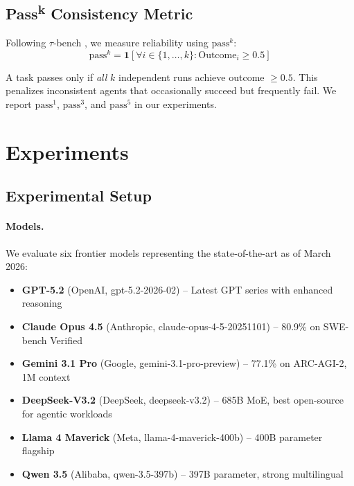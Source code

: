 \documentclass{article}
\newcommand{\passmark}{\text{pass}^k}
\begin{document}
\subsection{Pass\textsuperscript{k} Consistency Metric}

Following $\tau$-bench \citep{taubench2024}, we measure reliability using $\passmark$:
\begin{equation}
\passmark = \mathbf{1}\left[\forall i \in \{1, \ldots, k\}: \text{Outcome}_i \geq 0.5\right]
\end{equation}

A task passes only if \emph{all} $k$ independent runs achieve outcome $\geq 0.5$. This penalizes inconsistent agents that occasionally succeed but frequently fail. We report $\text{pass}^1$, $\text{pass}^3$, and $\text{pass}^5$ in our experiments.

\section{Experiments}
\label{sec:experiments}

\subsection{Experimental Setup}

\paragraph{Models.} We evaluate six frontier models representing the state-of-the-art as of March 2026:
\begin{itemize}[leftmargin=*, itemsep=1pt]
    \item \textbf{GPT-5.2} (OpenAI, gpt-5.2-2026-02) -- Latest GPT series with enhanced reasoning
    \item \textbf{Claude Opus 4.5} (Anthropic, claude-opus-4-5-20251101) -- 80.9\% on SWE-bench Verified
    \item \textbf{Gemini 3.1 Pro} (Google, gemini-3.1-pro-preview) -- 77.1\% on ARC-AGI-2, 1M context
    \item \textbf{DeepSeek-V3.2} (DeepSeek, deepseek-v3.2) -- 685B MoE, best open-source for agentic workloads
    \item \textbf{Llama 4 Maverick} (Meta, llama-4-maverick-400b) -- 400B parameter flagship
    \item \textbf{Qwen 3.5} (Alibaba, qwen-3.5-397b) -- 397B parameter, strong multilingual
\end{itemize}
\end{document}
